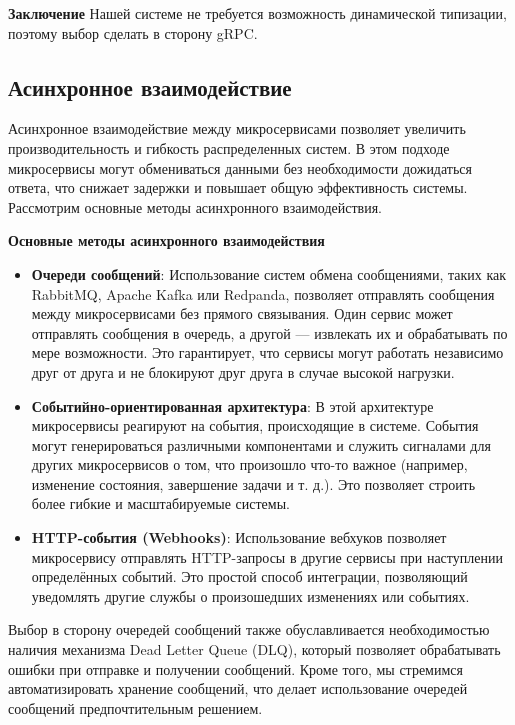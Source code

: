 \textbf{Заключение}
Нашей системе не требуется возможность динамической типизации, поэтому выбор сделать в сторону gRPC.

\subsection{Асинхронное взаимодействие} %

Асинхронное взаимодействие между микросервисами позволяет увеличить производительность и гибкость распределенных систем. В этом подходе микросервисы могут обмениваться данными без необходимости дожидаться ответа, что снижает задержки и повышает общую эффективность системы. Рассмотрим основные методы асинхронного взаимодействия.

\textbf{Основные методы асинхронного взаимодействия}
\begin{itemize}
    \item \textbf{Очереди сообщений}: Использование систем обмена сообщениями, таких как RabbitMQ, Apache Kafka или Redpanda, позволяет отправлять сообщения между микросервисами без прямого связывания. Один сервис может отправлять сообщения в очередь, а другой — извлекать их и обрабатывать по мере возможности. Это гарантирует, что сервисы могут работать независимо друг от друга и не блокируют друг друга в случае высокой нагрузки.
    \item \textbf{Событийно-ориентированная архитектура}: В этой архитектуре микросервисы реагируют на события, происходящие в системе. События могут генерироваться различными компонентами и служить сигналами для других микросервисов о том, что произошло что-то важное (например, изменение состояния, завершение задачи и т. д.). Это позволяет строить более гибкие и масштабируемые системы.
    \item \textbf{HTTP-события (Webhooks)}: Использование вебхуков позволяет микросервису отправлять HTTP-запросы в другие сервисы при наступлении определённых событий. Это простой способ интеграции, позволяющий уведомлять другие службы о произошедших изменениях или событиях.
\end{itemize}

Выбор в сторону очередей сообщений также обуславливается необходимостью наличия механизма Dead Letter Queue (DLQ), который позволяет обрабатывать ошибки при отправке и получении сообщений. Кроме того, мы стремимся автоматизировать хранение сообщений, что делает использование очередей сообщений предпочтительным решением.

